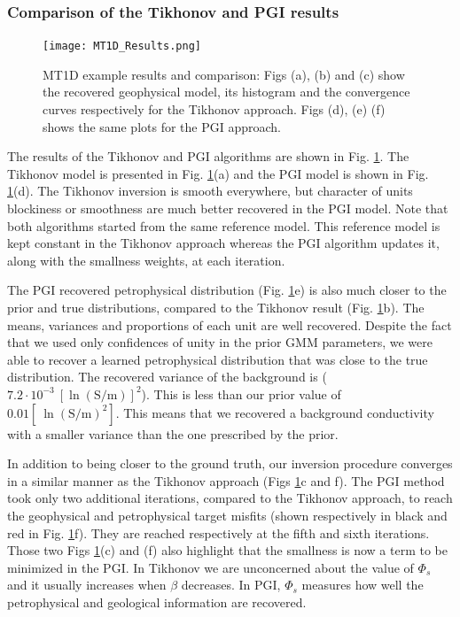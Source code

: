 \documentclass[extra]{gji} %
\begin{document}
\subsubsection{Comparison of the Tikhonov and PGI results}

\begin{figure}
 \centering
 \texttt{[image: MT1D\_Results.png]}
    \caption[]{MT1D example results and comparison: Figs (a), (b) and (c) show the recovered geophysical model, its histogram and the convergence curves respectively for the Tikhonov approach. Figs (d), (e) (f) shows the same plots for the PGI approach.}
 \label{fig:MT1D_smooth}
\end{figure}

The results of the Tikhonov and PGI algorithms are shown in Fig. \ref{fig:MT1D_smooth}. The Tikhonov model is presented in Fig. \ref{fig:MT1D_smooth}(a) and the PGI model is shown in Fig. \ref{fig:MT1D_smooth}(d). The Tikhonov inversion is smooth everywhere, but character of  units blockiness or smoothness are much better recovered in the PGI model. Note that both algorithms started from the same reference model. This reference model is kept constant in the Tikhonov approach whereas the PGI algorithm updates it, along with the smallness weights, at each iteration.

The PGI recovered petrophysical distribution (Fig. \ref{fig:MT1D_smooth}e) is also much closer to the prior and true distributions, compared to the Tikhonov result (Fig. \ref{fig:MT1D_smooth}b). The means, variances and proportions of each unit are well recovered. Despite the fact that we used only confidences of unity in the prior GMM parameters, we were able to recover a learned petrophysical distribution that was close to the true distribution. The recovered variance of the background is ($7.2 \cdot 10^{-3}~[\ln(\text{S/m})]^2$). This is less than our prior value of $0.01[~\ln(\text{S/m})^2]$. This means that we recovered a background conductivity with a smaller variance than the one prescribed by the prior.

In addition to being closer to the ground truth, our inversion procedure converges in a similar manner as the Tikhonov approach (Figs \ref{fig:MT1D_smooth}c and f). The PGI method took only two additional iterations, compared to the Tikhonov approach, to reach the geophysical and petrophysical target misfits (shown respectively in black and red in Fig. \ref{fig:MT1D_smooth}f). They are reached respectively at the fifth and sixth iterations. Those two Figs \ref{fig:MT1D_smooth}(c) and (f) also highlight that the smallness is now a term to be minimized in the PGI. In Tikhonov we are unconcerned about the value of $\Phi_s$ and it usually increases when $\beta$ decreases. In PGI, $\Phi_s$ measures how well the petrophysical and geological information are recovered.
\end{document}
